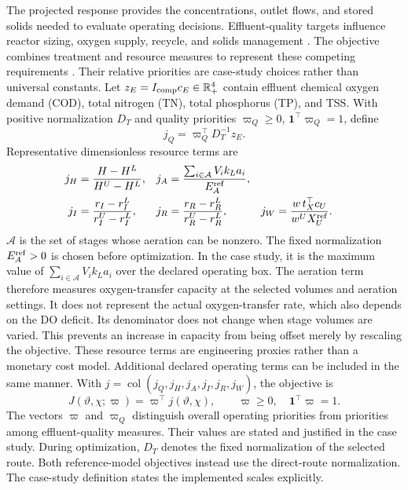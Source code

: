 \documentclass[a4paper,fleqn]{cas-sc}
\newcommand{\R}{\mathbb{R}}
\newcommand{\col}{\operatorname{col}}
\begin{document}
The projected response provides the concentrations, outlet flows, and stored solids needed to evaluate operating decisions. Effluent-quality targets influence reactor sizing, oxygen supply, recycle, and solids management \citep{Henze2008}. The objective combines treatment and resource measures to represent these competing requirements \citep{Araujo2013,PadronPaez2020}. Their relative priorities are case-study choices rather than universal constants. Let $z_E=I_{\rm comp}c_E\in\R_+^4$ contain effluent chemical oxygen demand (COD), total nitrogen (TN), total phosphorus (TP), and TSS. With positive normalization $D_T$ and quality priorities $\varpi_Q\ge0$, $\mathbf1^\top\varpi_Q=1$, define
\begin{equation}
j_Q=\varpi_Q^\top D_T^{-1}z_E.
\label{eq:qualitycomponent}
\end{equation}
Representative dimensionless resource terms are
\begin{align}
j_H&=\frac{H-H^L}{H^U-H^L},&
j_A&=\frac{\sum_{i\in\mathcal A}V_i k_La_i}
{E_A^{\rm ref}},\notag\\
j_I&=\frac{r_I-r_I^L}{r_I^U-r_I^L},&
j_R&=\frac{r_R-r_R^L}{r_R^U-r_R^L},&
j_W&=\frac{w\,t_X^\top c_U}{w^UX_U^{\rm ref}}.
\label{eq:objectivecomponents}
\end{align}
$\mathcal A$ is the set of stages whose aeration can be nonzero. The fixed normalization $E_A^{\rm ref}>0$ is chosen before optimization. In the case study, it is the maximum value of $\sum_{i\in\mathcal A}V_i k_La_i$ over the declared operating box. The aeration term therefore measures oxygen-transfer capacity at the selected volumes and aeration settings. It does not represent the actual oxygen-transfer rate, which also depends on the DO deficit. Its denominator does not change when stage volumes are varied. This prevents an increase in capacity from being offset merely by rescaling the objective. These resource terms are engineering proxies rather than a monetary cost model. Additional declared operating terms can be included in the same manner. With $j=\col(j_Q,j_H,j_A,j_I,j_R,j_W)$, the objective is
\begin{equation}
J(\vartheta,\chi;\varpi)=\varpi^\top j(\vartheta,\chi),
\qquad \varpi\ge0,\quad \mathbf1^\top\varpi=1.
\label{eq:objective}
\end{equation}
The vectors $\varpi$ and $\varpi_Q$ distinguish overall operating priorities from priorities among effluent-quality measures. Their values are stated and justified in the case study. During optimization, $D_T$ denotes the fixed normalization of the selected route. Both reference-model objectives instead use the direct-route normalization. The case-study definition states the implemented scales explicitly.
\end{document}
